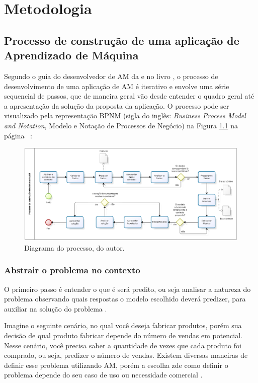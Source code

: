\chapter{Metodologia}
\section{Processo de construção de uma aplicação de Aprendizado de Máquina}

Segundo o guia do desenvolvedor de AM da \cite{Amazon} e no livro \cite{geron2017hands}, o processo de desenvolvimento de uma aplicação de AM é iterativo e envolve uma série sequencial de passos, que de maneira geral vão desde entender o quadro geral até a apresentação da solução da proposta da aplicação. O processo pode ser visualizado pela representação BPNM (sigla do inglês: \textit{Business Process Model and Notation}, Modelo e Notação de Processos de Negócio) na Figura \ref{ProcessoAM} na página ~\pageref{ProcessoAM}:

\begin{figure}[h]
	\centering
	\includegraphics[width=1\textwidth]{figuras/Processoam.eps}
	\caption{Diagrama do processo, do autor.}
	\label{ProcessoAM}
\end{figure}

\subsection{Abstrair o problema no contexto}
O primeiro passo é entender o que é será predito, ou seja analisar a natureza do problema observando quais respostas o modelo escolhido deverá predizer, para auxiliar na solução do problema \cite{geron2017hands}.

Imagine o seguinte cenário, no qual você deseja fabricar produtos, porém sua decisão de qual produto fabricar depende do número de vendas em potencial. Nesse cenário, você precisa saber a quantidade de vezes que cada produto foi comprado, ou seja, predizer o número de vendas. Existem diversas maneiras de definir esse problema utilizando AM, porém a escolha  zde como definir o problema depende do seu caso de uso ou necessidade comercial \cite{Amazon}.

